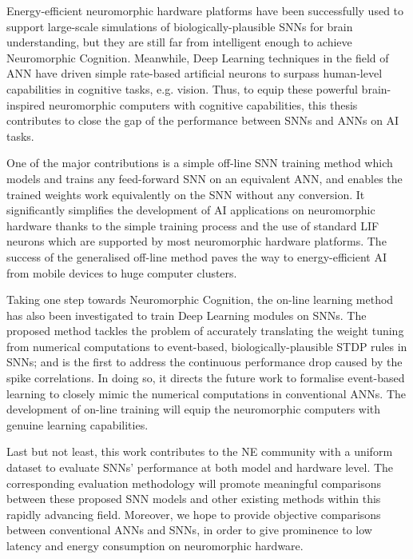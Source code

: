
Energy-efficient neuromorphic hardware platforms have been successfully used to support large-scale simulations of biologically-plausible SNNs for brain understanding, but they are still far from intelligent enough to achieve Neuromorphic Cognition.
Meanwhile, Deep Learning techniques in the field of ANN have driven simple rate-based artificial neurons to surpass human-level capabilities in cognitive tasks, e.g. vision.
Thus, to equip these powerful brain-inspired neuromorphic computers with cognitive capabilities, this thesis contributes to close the gap of the performance between SNNs and ANNs on AI tasks.

One of the major contributions is a simple off-line SNN training method which models and trains any feed-forward SNN on an equivalent ANN, and enables the trained weights work equivalently on the SNN without any conversion.
It significantly simplifies the development of AI applications on neuromorphic hardware thanks to the simple training process and the use of standard LIF neurons which are supported by most neuromorphic hardware platforms.
The success of the generalised off-line method paves the way to energy-efficient AI from mobile devices to huge computer clusters.


Taking one step towards Neuromorphic Cognition, the on-line learning method has also been investigated to train Deep Learning modules on SNNs.
The proposed method tackles the problem of accurately translating the weight tuning from numerical computations to event-based, biologically-plausible STDP rules in SNNs;
and is the first to address the continuous performance drop caused by the spike correlations.
In doing so, it directs the future work to formalise event-based learning to closely mimic the numerical computations in conventional ANNs.
The development of on-line training will equip the neuromorphic computers with genuine learning capabilities.

Last but not least, this work contributes to the NE community with a uniform dataset to evaluate SNNs' performance at both model and hardware level.
The corresponding evaluation methodology will promote meaningful comparisons between these proposed SNN models and other existing methods within this rapidly advancing field.
Moreover, we hope to provide objective comparisons between conventional ANNs and SNNs, in order to give prominence to low latency and energy consumption on neuromorphic hardware.


